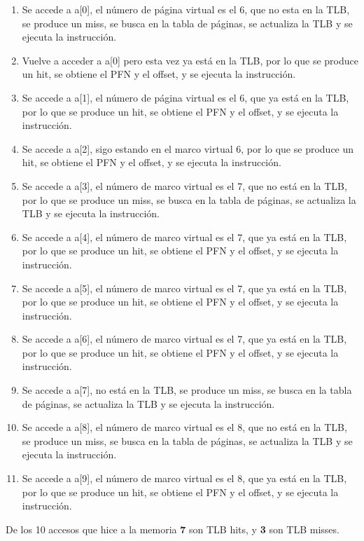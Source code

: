 \documentclass{article}
\begin{document}
\begin{enumerate}
    \item Se accede a a[0], el número de página virtual es el 6, que no esta en la TLB, se produce un miss, se busca en la tabla de páginas, se actualiza la TLB y se ejecuta la instrucción.
    \item Vuelve a acceder a a[0] pero esta vez ya está en la TLB, por lo que se produce un hit, se obtiene el PFN y el offset, y se ejecuta la instrucción.
    \item Se accede a a[1], el número de página virtual es el 6, que ya está en la TLB, por lo que se produce un hit, se obtiene el PFN y el offset, y se ejecuta la instrucción.
    \item Se accede a a[2], sigo estando en el marco virtual 6, por lo que se produce un hit, se obtiene el PFN y el offset, y se ejecuta la instrucción.
    \item Se accede a a[3], el número de marco virtual es el 7, que no está en la TLB, por lo que se produce un miss, se busca en la tabla de páginas, se actualiza la TLB y se ejecuta la instrucción.
    \item Se accede a a[4], el número de marco virtual es el 7, que ya está en la TLB, por lo que se produce un hit, se obtiene el PFN y el offset, y se ejecuta la instrucción.
    \item Se accede a a[5], el número de marco virtual es el 7, que ya está en la TLB, por lo que se produce un hit, se obtiene el PFN y el offset, y se ejecuta la instrucción.
    \item Se accede a a[6], el número de marco virtual es el 7, que ya está en la TLB, por lo que se produce un hit, se obtiene el PFN y el offset, y se ejecuta la instrucción.
    \item Se accede a a[7], no está en la TLB, se produce un miss, se busca en la tabla de páginas, se actualiza la TLB y se ejecuta la instrucción.
    \item Se accede a a[8], el número de marco virtual es el 8, que no está en la TLB, se produce un miss, se busca en la tabla de páginas, se actualiza la TLB y se ejecuta la instrucción.
    \item Se accede a a[9], el número de marco virtual es el 8, que ya está en la TLB, por lo que se produce un hit, se obtiene el PFN y el offset, y se ejecuta la instrucción.
\end{enumerate}
De los 10 accesos que hice a la memoria \textbf{7} son TLB hits, y \textbf{3} son TLB misses. 
\end{document}
